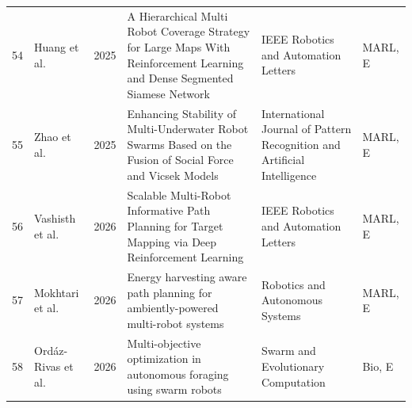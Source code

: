 \begin{longtable}{@{}r>{\raggedright\arraybackslash}p{2.3cm}r>{\raggedright\arraybackslash}p{5.4cm}>{\raggedright\arraybackslash}p{3.0cm}p{1.4cm}@{}}
54 & Huang et al. & 2025 & A Hierarchical Multi Robot Coverage Strategy for Large Maps With Reinforcement Learning and Dense Segmented Siamese Network & IEEE Robotics and Automation Letters & MARL, E \\
55 & Zhao et al. & 2025 & Enhancing Stability of Multi-Underwater Robot Swarms Based on the Fusion of Social Force and Vicsek Models & International Journal of Pattern Recognition and Artificial Intelligence & MARL, E \\
56 & Vashisth et al. & 2026 & Scalable Multi-Robot Informative Path Planning for Target Mapping via Deep Reinforcement Learning & IEEE Robotics and Automation Letters & MARL, E \\
57 & Mokhtari et al. & 2026 & Energy harvesting aware path planning for ambiently-powered multi-robot systems & Robotics and Autonomous Systems & MARL, E \\
58 & Ordáz-Rivas et al. & 2026 & Multi-objective optimization in autonomous foraging using swarm robots & Swarm and Evolutionary Computation & Bio, E \\
\hline
\end{longtable}
\endgroup

